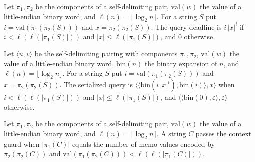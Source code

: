 \begin{definition}
\label{Complexity.ladner_queryDeadline}
\leanok
{}
Let $\pi_1,\pi_2$ be the components of a self-delimiting pair, $\mathrm{val}(w)$ the value of
a little-endian binary word, and $\ell(n)=\lfloor\log_2 n\rfloor$. For a string $S$ put
$i=\mathrm{val}(\pi_1(\pi_2(S)))$ and $x=\pi_2(\pi_2(S))$. The query deadline is $i\,|x|^i$
if $i<\ell(\ell(|\pi_1(S)|))$ and $|x|\le\ell(|\pi_1(S)|)$, and $0$ otherwise.
\end{definition}

\begin{definition}
\label{Complexity.ladner_queryPrep}
\leanok
{}
Let $\langle u,v\rangle$ be the self-delimiting pairing with components $\pi_1,\pi_2$,
$\mathrm{val}(w)$ the value of a little-endian binary word, $\mathrm{bin}(n)$ the binary
expansion of $n$, and $\ell(n)=\lfloor\log_2 n\rfloor$. For a string $S$ put
$i=\mathrm{val}(\pi_1(\pi_2(S)))$ and $x=\pi_2(\pi_2(S))$. The serialized query is
$\langle\langle\mathrm{bin}(i\,|x|^i),\mathrm{bin}(i)\rangle,x\rangle$ when
$i<\ell(\ell(|\pi_1(S)|))$ and $|x|\le\ell(|\pi_1(S)|)$, and
$\langle\langle\mathrm{bin}(0),\varepsilon\rangle,\varepsilon\rangle$ otherwise.
\end{definition}

\begin{definition}
\label{Complexity.ladner_ctxGuard}
\leanok
{}
Let $\pi_1,\pi_2$ be the components of a self-delimiting pair, $\mathrm{val}(w)$ the value of
a little-endian binary word, and $\ell(n)=\lfloor\log_2 n\rfloor$. A string $C$ passes the
context guard when $|\pi_1(C)|$ equals the number of memo values encoded by
$\pi_2(\pi_2(C))$ and $\mathrm{val}(\pi_1(\pi_2(C)))<\ell(\ell(|\pi_1(C)|))$.
\end{definition}

